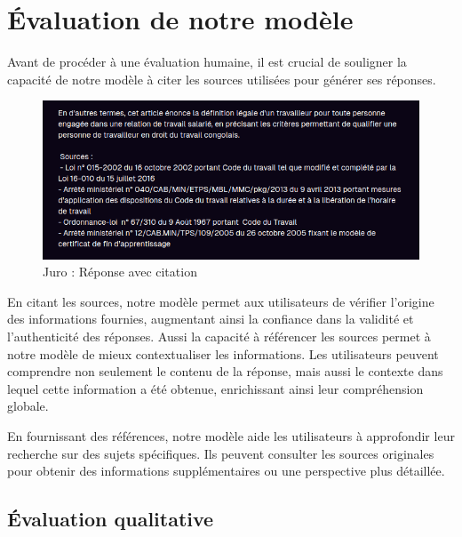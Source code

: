 \newpage
\newpage
\section{Évaluation de notre modèle}

Avant de procéder à une évaluation humaine, il est crucial de souligner la capacité de notre modèle à citer les sources utilisées pour générer ses réponses. 

\begin{figure}[H]
    \centering
    \includegraphics[width=15cm]{gfx/juro-source.png}
    \caption{Juro : Réponse avec citation}
    \label{fig:juro-source-citing}
\end{figure}

En citant les sources, notre modèle permet aux utilisateurs de vérifier l'origine des informations fournies, augmentant ainsi la confiance dans la validité et l'authenticité des réponses. Aussi la capacité à référencer les sources permet à notre modèle de mieux contextualiser les informations. Les utilisateurs peuvent comprendre non seulement le contenu de la réponse, mais aussi le contexte dans lequel cette information a été obtenue, enrichissant ainsi leur compréhension globale.

En fournissant des références, notre modèle aide les utilisateurs à approfondir leur recherche sur des sujets spécifiques. Ils peuvent consulter les sources originales pour obtenir des informations supplémentaires ou une perspective plus détaillée.

\subsection{Évaluation qualitative}

